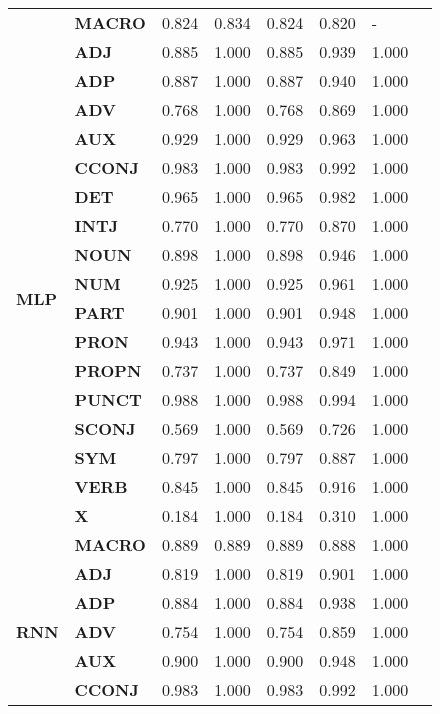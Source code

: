 \begin{longtable}{|l||l||l||l||l||l||l||l|}
\textbf{} & \textbf{MACRO} & 0.824 & 0.834 & 0.824 & 0.820 & - \\
\cline{1-7}
\multirow[t]{18}{*}{\textbf{MLP}} & \textbf{ADJ} & 0.885 & 1.000 & 0.885 & 0.939 & 1.000 \\
\textbf{} & \textbf{ADP} & 0.887 & 1.000 & 0.887 & 0.940 & 1.000 \\
\textbf{} & \textbf{ADV} & 0.768 & 1.000 & 0.768 & 0.869 & 1.000 \\
\textbf{} & \textbf{AUX} & 0.929 & 1.000 & 0.929 & 0.963 & 1.000 \\
\textbf{} & \textbf{CCONJ} & 0.983 & 1.000 & 0.983 & 0.992 & 1.000 \\
\textbf{} & \textbf{DET} & 0.965 & 1.000 & 0.965 & 0.982 & 1.000 \\
\textbf{} & \textbf{INTJ} & 0.770 & 1.000 & 0.770 & 0.870 & 1.000 \\
\textbf{} & \textbf{NOUN} & 0.898 & 1.000 & 0.898 & 0.946 & 1.000 \\
\textbf{} & \textbf{NUM} & 0.925 & 1.000 & 0.925 & 0.961 & 1.000 \\
\textbf{} & \textbf{PART} & 0.901 & 1.000 & 0.901 & 0.948 & 1.000 \\
\textbf{} & \textbf{PRON} & 0.943 & 1.000 & 0.943 & 0.971 & 1.000 \\
\textbf{} & \textbf{PROPN} & 0.737 & 1.000 & 0.737 & 0.849 & 1.000 \\
\textbf{} & \textbf{PUNCT} & 0.988 & 1.000 & 0.988 & 0.994 & 1.000 \\
\textbf{} & \textbf{SCONJ} & 0.569 & 1.000 & 0.569 & 0.726 & 1.000 \\
\textbf{} & \textbf{SYM} & 0.797 & 1.000 & 0.797 & 0.887 & 1.000 \\
\textbf{} & \textbf{VERB} & 0.845 & 1.000 & 0.845 & 0.916 & 1.000 \\
\textbf{} & \textbf{X} & 0.184 & 1.000 & 0.184 & 0.310 & 1.000 \\
\textbf{} & \textbf{MACRO} & 0.889 & 0.889 & 0.889 & 0.888 & 1.000 \\
\cline{1-7}
\multirow[t]{18}{*}{\textbf{RNN}} & \textbf{ADJ} & 0.819 & 1.000 & 0.819 & 0.901 & 1.000 \\
\textbf{} & \textbf{ADP} & 0.884 & 1.000 & 0.884 & 0.938 & 1.000 \\
\textbf{} & \textbf{ADV} & 0.754 & 1.000 & 0.754 & 0.859 & 1.000 \\
\textbf{} & \textbf{AUX} & 0.900 & 1.000 & 0.900 & 0.948 & 1.000 \\
\textbf{} & \textbf{CCONJ} & 0.983 & 1.000 & 0.983 & 0.992 & 1.000 \\

\end{longtable}
